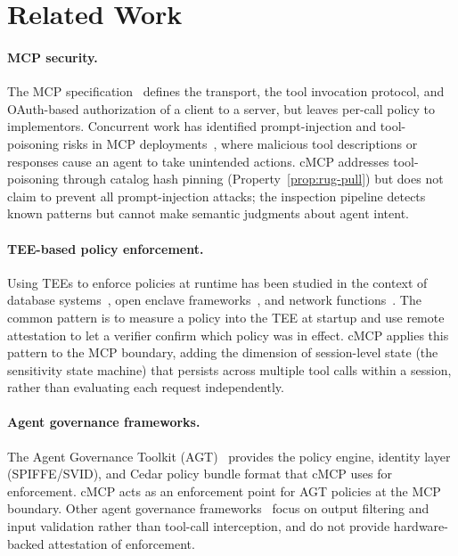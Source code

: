 \section{Related Work}
\label{sec:related}

\paragraph{MCP security.}
The MCP specification~\citep{mcp2024} defines the transport, the tool invocation
protocol, and OAuth-based authorization of a client to a server, but leaves per-call policy
to implementors. Concurrent work has identified
prompt-injection and tool-poisoning risks in MCP deployments~\citep{mcpsecurity2025}, where
malicious tool descriptions or responses cause an agent to take unintended actions. cMCP
addresses tool-poisoning through catalog hash pinning (Property~\ref{prop:rug-pull}) but
does not claim to prevent all prompt-injection attacks; the inspection pipeline detects
known patterns but cannot make semantic judgments about agent intent.

\paragraph{TEE-based policy enforcement.}
Using TEEs to enforce policies at runtime has been studied in the context of database
systems~\citep{teedb2017}, open enclave frameworks~\citep{keystone2020}, and network
functions~\citep{teefw2019}. The common pattern is to measure a policy into the TEE at
startup and use remote attestation to let a verifier confirm which policy was in effect.
cMCP applies this pattern to the MCP boundary, adding the dimension of session-level state
(the sensitivity state machine) that persists across multiple tool calls within a session,
rather than evaluating each request independently.

\paragraph{Agent governance frameworks.}
The Agent Governance Toolkit (AGT)~\citep{agt2026} provides the policy engine, identity
layer (SPIFFE/SVID), and Cedar policy bundle format that cMCP uses for enforcement.
cMCP acts as an enforcement point for AGT policies at the MCP boundary. Other agent
governance frameworks~\citep{guardrails2023,nemo2023} focus on output filtering and input
validation rather than tool-call interception, and do not provide hardware-backed
attestation of enforcement.

